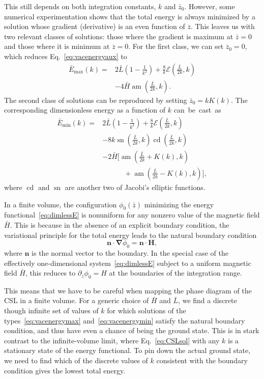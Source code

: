 \documentclass[pdflatex,iicol,sn-mathphys-num]{sn-jnl}
\let\p=\phi
\let\de=\partial
\DeclareMathOperator{\am}{am}%
\DeclareMathOperator{\cd}{cd}%
\DeclareMathOperator{\sn}{sn}%
\newcommand{\vek}[1]{\bm{#1}}%
\newcommand{\grad}{\vek\nabla}%
\begin{document}
This still depends on both integration constants, $k$ and $\bar z_0$. However, some numerical experimentation shows that the total energy is always minimized by a solution whose gradient (derivative) is an even function of $\bar z$. This leaves us with two relevant classes of solutions: those where the gradient is maximum at $\bar z=0$ and those where it is minimum at $\bar z=0$. For the first class, we can set $\bar z_0=0$, which reduces Eq.~\eqref{eq:vacenergyaux} to
\begin{equation}
\begin{split}
\bar E_\text{max}(k)={}&2\bar L\left(1-\frac1{k^2}\right)+\frac8k\mathcal E(\tfrac{\bar L}{2k},k)\\
&-4\bar H\am(\tfrac{\bar L}{2k},k).
\end{split}
\label{eq:vacenergymax}
\end{equation}
The second class of solutions can be reproduced by setting $\bar z_0=kK(k)$. The corresponding dimensionless energy as a function of $k$ can~be~cast~as
\begin{equation}
\begin{split}
\bar E_\text{min}(k)={}&2\bar L\left(1-\frac1{k^2}\right)+\frac8k\mathcal E(\tfrac{\bar L}{2k},k)\\
&-8k\sn(\tfrac{\bar L}{2k},k)\cd(\tfrac{\bar L}{2k},k)\\
&-2\bar H\bigl[\am(\tfrac{\bar L}{2k}+K(k),k)\\
&\qquad\quad+\am(\tfrac{\bar L}{2k}-K(k),k)\bigr],
\end{split}
\label{eq:vacenergymin}
\end{equation}
where $\cd$ and $\sn$ are another two of Jacobi's elliptic functions.

In a finite volume, the configuration $\p_0(\bar z)$ minimizing the energy functional~\eqref{eq:dimlessE} is nonuniform for any nonzero value of the magnetic field $\bar H$. This is because in the absence of an explicit boundary condition, the variational principle for the total energy leads to the natural boundary condition
\begin{equation}
\vek n\cdot\grad\p_0=\vek n\cdot\vek H,
\label{eq:naturalBC}
\end{equation}
where $\vek n$ is the normal vector to the boundary. In the special case of the effectively one-dimensional system~\eqref{eq:dimlessE} subject to a uniform magnetic field $\bar H$, this reduces to $\de_ z\p_0=H$ at the boundaries of the integration range. 

This means that we have to be careful when mapping the phase diagram of the CSL in a finite volume. For a generic choice of $\bar H$ and $\bar L$, we find a discrete though infinite set of values of $k$ for which solutions of the types~\eqref{eq:vacenergymax} and~\eqref{eq:vacenergymin} satisfy the natural boundary condition, and thus have even a chance of being the ground state. This is in stark contrast to the infinite-volume limit, where Eq.~\eqref{eq:CSLsol} with any $k$ is a stationary state of the energy functional. To pin down the actual ground state, we need to find which of the discrete values of $k$ consistent with the boundary condition gives the lowest total energy. 
\end{document}
